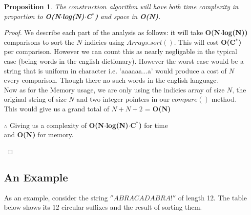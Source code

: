 \documentclass[12pt]{article}
\newtheorem{proposition}[theorem]{Proposition}
\begin{document}
\begin{proposition}
\label{numq}
The $construction$ algorithm will have both time complexity in
proportion to \textbf{O(N$\cdot$log(N)$\cdot$C$^{\ast}$)} and space
in \textbf{O(N)}.

\end{proposition}
\begin{proof}
We describe each part of the analysis as follows: it will take \textbf{O(N$\cdot$log(N))}
comparisons to sort the $N$ indicies using $Arrays.sort()$. This will cost \textbf{O(C$^{\ast}$)}
per comparison. However we can count this as nearly negligable in the typical case (being
words in the english dictionary). However the worst case would be a string that is uniform
in character i.e. 'aaaaaa...a' would produce a cost of $N$ every comparison. Though there
no such words in the english language. \\
\indent Now as for the Memory usage, we are only using the indicies array of size $N$,
the original string of size $N$ and two integer pointers in our $compare()$ method. This would
give us a grand total of $N + N + 2$ = \textbf{O(N)}
\begin{center}
    $\therefore$ Giving us a complexity of \textbf{O(N$\cdot$log(N)$\cdot$C$^{\ast}$)} for time \\
    and \textbf{O(N)} for memory.
\end{center}
\end{proof}

\newpage
\subsection{An Example}
As an example, consider the string $''ABRACADABRA!''$ of length 12. The table below shows its
12 circular suffixes and the result of sorting them.
\end{document}
